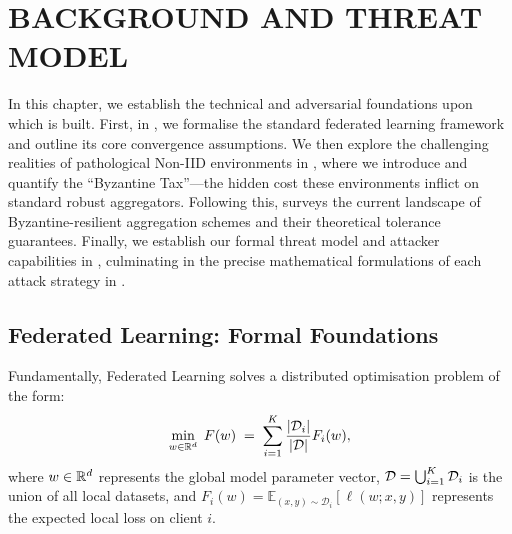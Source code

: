\documentclass[../main]{subfiles}
\begin{document}
\chapter{BACKGROUND AND THREAT MODEL}
\label{ch:background}

In this chapter, we establish the technical and adversarial foundations upon which \aegis{} is built. First, in , we formalise the standard federated learning framework and outline its core convergence assumptions. We then explore the challenging realities of pathological Non-IID environments in , where we introduce and quantify the ``Byzantine Tax''---the hidden cost these environments inflict on standard robust aggregators. Following this,  surveys the current landscape of Byzantine-resilient aggregation schemes and their theoretical tolerance guarantees. Finally, we establish our formal threat model and attacker capabilities in , culminating in the precise mathematical formulations of each attack strategy in .

\section{Federated Learning: Formal Foundations}
\label{sec:bg_fl}

Fundamentally, Federated Learning solves a distributed optimisation problem of the form:
\begin{equation}
    \min_{w \in \mathbb{R}^{d}} \; F(w) \;=\; \sum_{i=1}^{K} \frac{|\mathcal{D}_i|}{|\mathcal{D}|} F_i(w),
    \label{eq:fl_objective}
\end{equation}
where $w \in \mathbb{R}^{d}$ represents the global model parameter vector, $\mathcal{D} = \bigcup_{i=1}^{K} \mathcal{D}_i$ is the union of all local datasets, and $F_i(w) = \mathbb{E}_{(x,y) \sim \mathcal{D}_i}[\ell(w; x, y)]$ represents the expected local loss on client $i$.
\end{document}
